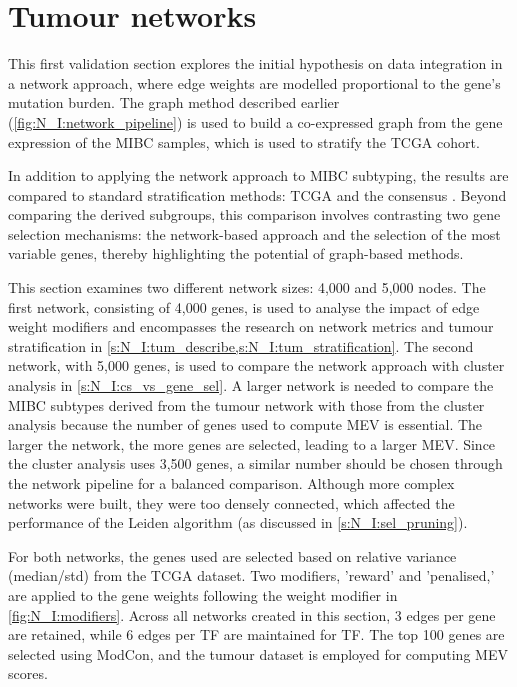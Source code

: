 \section{Tumour networks} \label{s:N_I:tum}


This first validation section explores the initial hypothesis on data integration in a network approach, where edge weights are modelled proportional to the gene's mutation burden. The graph method described earlier (\cref{fig:N_I:network_pipeline}) is used to build a co-expressed graph from the gene expression of the MIBC samples, which is used to stratify the TCGA cohort.

In addition to applying the network approach to MIBC subtyping, the results are compared to standard stratification methods: TCGA \citep{Robertson2017-mg} and the consensus \citep{Kamoun2020-tj}. Beyond comparing the derived subgroups, this comparison involves contrasting two gene selection mechanisms: the network-based approach and the selection of the most variable genes, thereby highlighting the potential of graph-based methods.

This section examines two different network sizes: 4,000 and 5,000 nodes. The first network, consisting of 4,000 genes, is used to analyse the impact of edge weight modifiers and encompasses the research on network metrics and tumour stratification in \cref{s:N_I:tum_describe,s:N_I:tum_stratification}. The second network, with 5,000 genes, is used to compare the network approach with cluster analysis in \cref{s:N_I:cs_vs_gene_sel}. A larger network is needed to compare the MIBC subtypes derived from the tumour network with those from the cluster analysis because the number of genes used to compute MEV is essential. The larger the network, the more genes are selected, leading to a larger MEV. Since the cluster analysis uses 3,500 genes, a similar number should be chosen through the network pipeline for a balanced comparison. Although more complex networks were built, they were too densely connected, which affected the performance of the Leiden algorithm (as discussed in \cref{s:N_I:sel_pruning}).

For both networks, the genes used are selected based on relative variance (median/std) from the TCGA dataset. Two modifiers, 'reward' and 'penalised,' are applied to the gene weights following the weight modifier in \cref{fig:N_I:modifiers}. Across all networks created in this section, 3 edges per gene are retained, while 6 edges per TF are maintained for TF. The top 100 genes are selected using ModCon, and the tumour dataset is employed for computing MEV scores.


